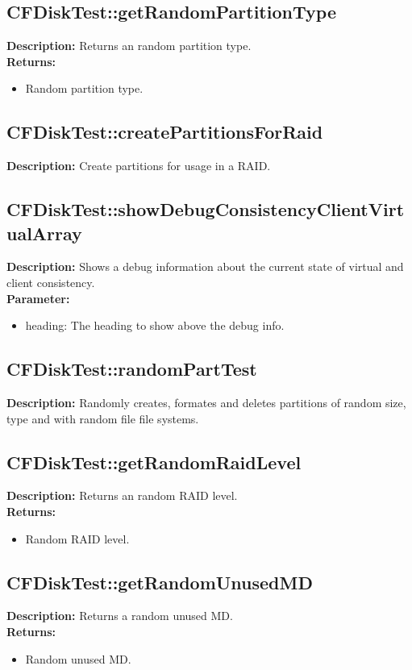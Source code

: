 \subsection{CFDiskTest::getRandomPartitionType}
\textbf{Description:} Returns an random partition type.\\
\textbf{Returns:}
\begin{itemize}
\item Random partition type.
\end{itemize}

\subsection{CFDiskTest::createPartitionsForRaid}
\textbf{Description:} Create partitions for usage in a RAID.\\

\subsection{CFDiskTest::showDebugConsistencyClientVirtualArray}
\textbf{Description:} Shows a debug information about the current state of virtual and client consistency.\\
\textbf{Parameter:}
\begin{itemize}
\item heading: The heading to show above the debug info.
\end{itemize}

\subsection{CFDiskTest::randomPartTest}
\textbf{Description:} Randomly creates, formates and deletes partitions of random size, type and with random file file systems.\\

\subsection{CFDiskTest::getRandomRaidLevel}
\textbf{Description:} Returns an random RAID level.\\
\textbf{Returns:}
\begin{itemize}
\item Random RAID level.
\end{itemize}

\subsection{CFDiskTest::getRandomUnusedMD}
\textbf{Description:} Returns a random unused MD.\\
\textbf{Returns:}
\begin{itemize}
\item Random unused MD.
\end{itemize}

